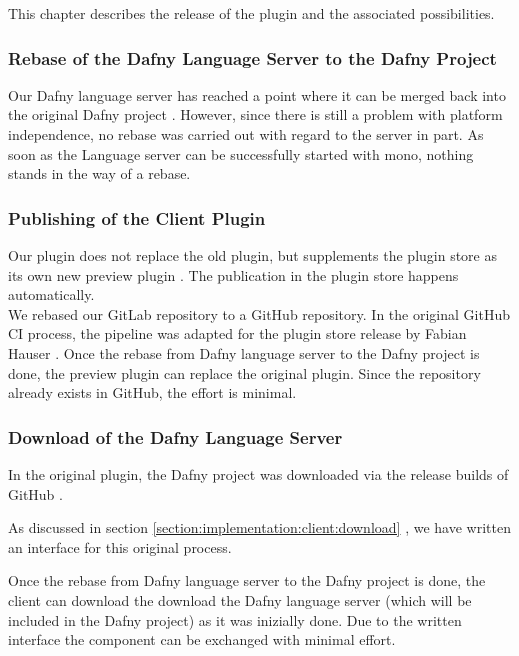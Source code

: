 This chapter describes the release of the plugin and the associated possibilities.

\subsubsection{Rebase of the Dafny Language Server to the Dafny Project}
Our Dafny language server has reached a point where it can be merged back into the original Dafny project \cite{dafny_lang_github}.
However, since there is still a problem with platform independence, no rebase was carried out with regard to the server in part.
As soon as the Language server can be successfully started with mono, nothing stands in the way of a rebase.

\subsubsection{Publishing of the Client Plugin}
Our plugin does not replace the old plugin, but supplements the plugin store as its own new preview plugin \cite{our-dafny-plugin}.
The publication in the plugin store happens automatically. \\

We rebased our GitLab repository to a GitHub repository.
In the original GitHub CI process, the pipeline 
was adapted for the plugin store release by Fabian Hauser \cite{our-dafny-plugin-github-publish}.
Once the rebase from Dafny language server to the Dafny project is done,
the preview plugin can replace the original plugin.
Since the repository already exists in GitHub, the effort is minimal.

\subsubsection{Download of the Dafny Language Server}
In the original plugin, the Dafny project was downloaded via the release builds of GitHub \cite{dafny_lang_builds}.

As discussed in section \ref{section:implementation:client:download} ,
we have written an interface for this original process.

Once the rebase from Dafny language server to the Dafny project is done,
the client can download the download the Dafny language server
(which will be included in the Dafny project) as it was inizially done.
Due to the written interface the component can be exchanged with minimal effort. \\

